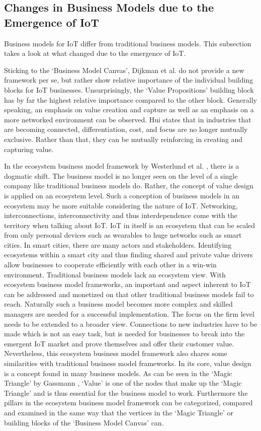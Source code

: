 	\subsection{Changes in Business Models due to the Emergence of IoT}
		Business models for IoT differ from traditional business models. This subsection takes a look at what changed due to the emergence of IoT.

		Sticking to the `Business Model Canvas', Dijkman et al. \cite{dijkman} do not provide a new framework per se, but rather show relative importance of the individual building blocks for IoT businesses. Unsurprisingly, the `Value Propositions' building block has by far the highest relative importance compared to the other block. Generally speaking, an emphasis on value creation and capture as well as an emphasis on a more networked environment can be observed. Hui \cite{hui} states that in industries that are becoming connected, differentiation, cost, and focus are no longer mutually exclusive. Rather than that, they can be mutually reinforcing in creating and capturing value.

		In the ecosystem business model framework by Westerlund et al. \cite{westerlund}, there is a dogmatic shift. The business model is no longer seen on the level of a single company like traditional business models do. Rather, the concept of value design is applied on an ecosystem level. Such a conception of business models in an ecosystem may be more suitable considering the nature of IoT. Networking, interconnections, interconnectivity and thus interdependence come with the territory when talking about IoT. IoT in itself is an ecosystem that can be scaled from only personal devices such as wearables to huge networks such as smart cities. In smart cities, there are many actors and stakeholders. Identifying ecosystems within a smart city and thus finding shared and private value drivers allow businesses to cooperate efficiently with each other in a win-win environment. Traditional business models lack an ecosystem view. With ecosystem business model frameworks, an important and aspect inherent to IoT can be addressed and monetized on that other traditional business models fail to reach. Naturally such a business model becomes more complex and skilled managers are needed for a successful implementation. The focus on the firm level needs to be extended to a broader view. Connections to new industries have to be made which is not an easy task, but is needed for businesses to break into the emergent IoT market and prove themselves and offer their customer value. Nevertheless, this ecosystem business model framework also shares some similarities with traditional business model frameworks. In its core, value design is a concept found in many business models. As can be seen in the `Magic Triangle' by Gassmann \cite{gassmann55}, `Value' is one of the nodes that make up the `Magic Triangle' and is thus essential for the business model to work. Furthermore the pillars in the ecosystem business model framework can be categorized, compared and examined in the same way that the vertices in the `Magic Triangle' or building blocks of the `Business Model Canvas' can.


